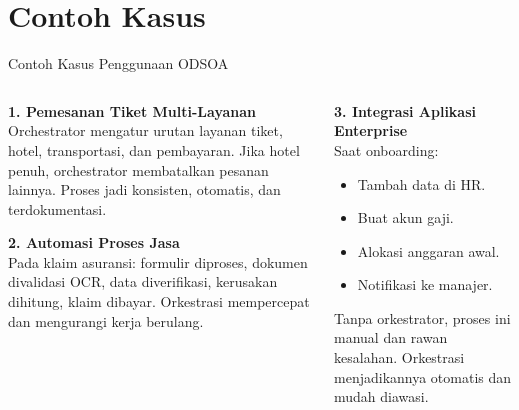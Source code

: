 \documentclass[aspectratio=169, table]{beamer}
\begin{document}
\section{Contoh Kasus}
\begin{frame}[fragile]{Contoh Kasus Penggunaan ODSOA}
	\vspace{4pt}
	\begin{columns}[T]
		\begin{column}{0.5\textwidth}
			\textbf{1. Pemesanan Tiket Multi-Layanan} \\
			Orchestrator mengatur urutan layanan tiket, hotel, transportasi, dan pembayaran. Jika hotel penuh, orchestrator membatalkan pesanan lainnya. Proses jadi konsisten, otomatis, dan terdokumentasi.
			
			\vspace{6pt}
			\textbf{2. Automasi Proses Jasa} \\
			Pada klaim asuransi: formulir diproses, dokumen divalidasi OCR, data diverifikasi, kerusakan dihitung, klaim dibayar. Orkestrasi mempercepat dan mengurangi kerja berulang.
		\end{column}
		
		\begin{column}{0.5\textwidth}
			\textbf{3. Integrasi Aplikasi Enterprise} \\
			Saat onboarding:
			\begin{itemize}
				\item Tambah data di HR.
				\item Buat akun gaji.
				\item Alokasi anggaran awal.
				\item Notifikasi ke manajer.
			\end{itemize}
			Tanpa orkestrator, proses ini manual dan rawan kesalahan. Orkestrasi menjadikannya otomatis dan mudah diawasi.
		\end{column}
	\end{columns}
\end{frame}
\end{document}
